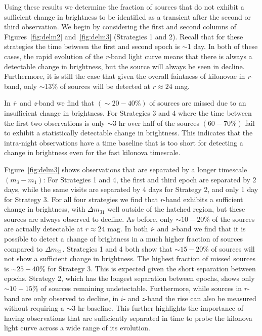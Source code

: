 Using these results we determine the fraction of sources that do not exhibit a sufficient change in brightness to be identified as a transient after the second or third observation. We begin by considering the first and second columns of Figures~\ref{fig:delm2} and~\ref{fig:delm3} (Strategies 1 and 2). Recall that for these strategies the time between the first and second epoch is $\sim$1 day. In both of these cases, the rapid evolution of the {\em r}-band light curve means that there is always a detectable change in brightness, but the source will always be seen in decline. Furthermore, it is still the case that given the overall faintness of kilonovae in {\em r}-band, only $\sim$13\% of sources will be detected at $r\approx24$ mag.

In {\em i}- and {\em z}-band we find that $(\sim 20-40\%)$ of sources are missed due to an insufficient change in brightness. For Strategies 3 and 4 where the time between the first two observations is only $\sim$3 hr over half of the sources $(60-70\%)$ fail to exhibit a statistically detectable change in brightness. This indicates that the intra-night observations have a time baseline that is too short for detecting a change in brightness even for the fast kilonova timescale.
   
Figure~\ref{fig:delm3} shows observations that are separated by a longer timescale $(m_3 - m_1)$: For Strategies 1 and 4, the first and third epoch are separated by 2 days, while the same visits are separated by 4 days for Strategy 2, and only 1 day for Strategy 3. For all four strategies we find that {\em r}-band exhibits a sufficient change in brightness, with $\Delta m_{31}$ well outside of the hatched region, but these sources are always observed to decline. As before, only $\sim10-20$\% of the sources are actually detectable at $r\approx24$ mag. In both {\em i}- and {\em z}-band we find that it is possible to detect a change of brightness in a much higher fraction of sources compared to $\Delta m_{21}$. Strategies 1 and 4 both show that $\sim 15-20\%$ of sources will not show a sufficient change in brightness. The highest fraction of missed sources is $\sim 25-40\%$ for Strategy 3. This is expected given the short separation between epochs. Strategy 2, which has the longest separation between epochs, shows only $\sim 10-15 \%$ of sources remaining undetectable. Furthermore, while sources in $r$-band are only observed to decline, in $i$- and $z$-band the rise can also be measured without requiring a $\sim$3 hr baseline. This further highlights the importance of having observations that are sufficiently separated in time to probe the kilonova light curve across a wide range of its evolution.

